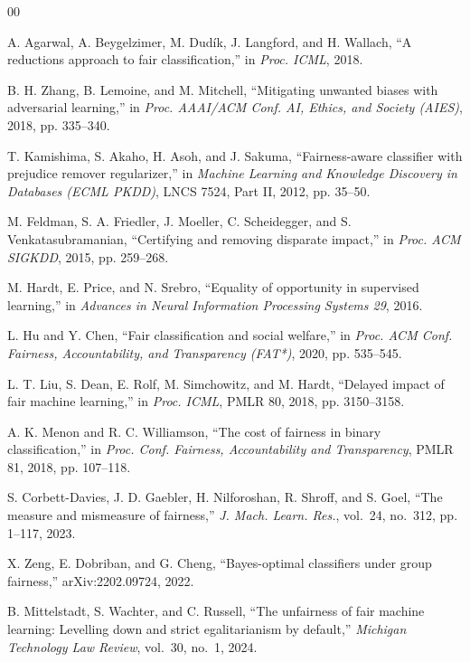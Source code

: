 \documentclass[conference]{IEEEtran}
\begin{document}
\begin{thebibliography}{00}

 A. Agarwal, A. Beygelzimer, M. Dud\'{i}k, J. Langford, and H. Wallach,
``A reductions approach to fair classification,'' in \emph{Proc. ICML}, 2018.

 B. H. Zhang, B. Lemoine, and M. Mitchell, ``Mitigating unwanted biases
with adversarial learning,'' in \emph{Proc. AAAI/ACM Conf. AI, Ethics, and Society (AIES)},
2018, pp. 335--340.

 T. Kamishima, S. Akaho, H. Asoh, and J. Sakuma, ``Fairness-aware
classifier with prejudice remover regularizer,'' in \emph{Machine Learning and Knowledge
Discovery in Databases (ECML PKDD)}, LNCS 7524, Part II, 2012, pp. 35--50.

 M. Feldman, S. A. Friedler, J. Moeller, C. Scheidegger, and
S. Venkatasubramanian, ``Certifying and removing disparate impact,'' in \emph{Proc. ACM
SIGKDD}, 2015, pp. 259--268.

 M. Hardt, E. Price, and N. Srebro, ``Equality of opportunity in
supervised learning,'' in \emph{Advances in Neural Information Processing Systems 29}, 2016.

 L. Hu and Y. Chen, ``Fair classification and social welfare,'' in
\emph{Proc. ACM Conf. Fairness, Accountability, and Transparency (FAT*)}, 2020,
pp. 535--545.

 L. T. Liu, S. Dean, E. Rolf, M. Simchowitz, and M. Hardt, ``Delayed impact
of fair machine learning,'' in \emph{Proc. ICML}, PMLR 80, 2018, pp. 3150--3158.

 A. K. Menon and R. C. Williamson, ``The cost of fairness in binary
classification,'' in \emph{Proc. Conf. Fairness, Accountability and Transparency}, PMLR 81,
2018, pp. 107--118.

 S. Corbett-Davies, J. D. Gaebler, H. Nilforoshan, R. Shroff, and
S. Goel, ``The measure and mismeasure of fairness,'' \emph{J. Mach. Learn. Res.}, vol.~24,
no.~312, pp. 1--117, 2023.

 X. Zeng, E. Dobriban, and G. Cheng, ``Bayes-optimal classifiers under
group fairness,'' arXiv:2202.09724, 2022.

 B. Mittelstadt, S. Wachter, and C. Russell, ``The unfairness of fair
machine learning: Levelling down and strict egalitarianism by default,'' \emph{Michigan
Technology Law Review}, vol.~30, no.~1, 2024.


\end{thebibliography}
\end{document}
